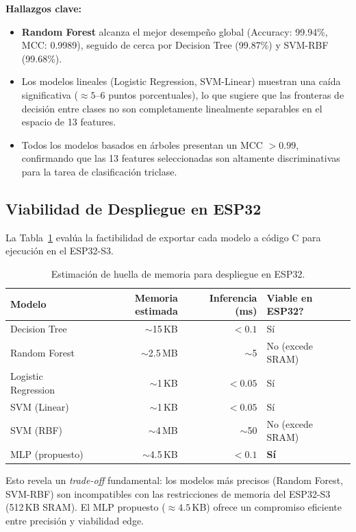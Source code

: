 \textbf{Hallazgos clave:}
\begin{itemize}[noitemsep, topsep=0pt]
    \item \textbf{Random Forest} alcanza el mejor desempeño global (Accuracy: 99.94\%, MCC: 0.9989), seguido de cerca por Decision Tree (99.87\%) y SVM-RBF (99.68\%).
    \item Los modelos lineales (Logistic Regression, SVM-Linear) muestran una caída significativa ($\approx 5$--$6$ puntos porcentuales), lo que sugiere que las fronteras de decisión entre clases no son completamente linealmente separables en el espacio de 13 features.
    \item Todos los modelos basados en árboles presentan un MCC $> 0.99$, confirmando que las 13 features seleccionadas son altamente discriminativas para la tarea de clasificación triclase.
\end{itemize}

\subsection{Viabilidad de Despliegue en ESP32}

La Tabla~\ref{tab:classic_esp32} evalúa la factibilidad de exportar cada modelo a código C para ejecución en el ESP32-S3.

\begin{table}[H]
\centering
\caption{Estimación de huella de memoria para despliegue en ESP32.}
\label{tab:classic_esp32}
\small
\begin{tabular}{l r r l}
\toprule
\textbf{Modelo} & \textbf{Memoria estimada} & \textbf{Inferencia (ms)} & \textbf{Viable en ESP32?} \\
\midrule
Decision Tree       & $\sim$15\,KB  & $< 0.1$ & Sí \\
Random Forest       & $\sim$2.5\,MB & $\sim$5  & No (excede SRAM) \\
Logistic Regression & $\sim$1\,KB   & $< 0.05$ & Sí \\
SVM (Linear)        & $\sim$1\,KB   & $< 0.05$ & Sí \\
SVM (RBF)           & $\sim$4\,MB   & $\sim$50 & No (excede SRAM) \\
MLP (propuesto)     & $\sim$4.5\,KB & $< 0.1$  & \textbf{Sí} \\
\bottomrule
\end{tabular}
\end{table}

Esto revela un \emph{trade-off} fundamental: los modelos más precisos (Random Forest, SVM-RBF) son incompatibles con las restricciones de memoria del ESP32-S3 (512\,KB SRAM). El MLP propuesto ($\approx 4.5$\,KB) ofrece un compromiso eficiente entre precisión y viabilidad edge.

